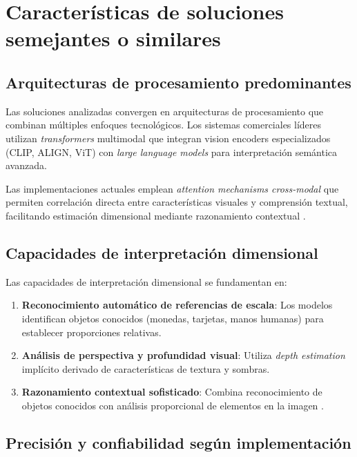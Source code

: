 \section{Características de soluciones semejantes o similares}

\subsection{Arquitecturas de procesamiento predominantes}

Las soluciones analizadas convergen en arquitecturas de procesamiento que combinan múltiples enfoques tecnológicos. Los sistemas comerciales líderes utilizan \textit{transformers} multimodal que integran vision encoders especializados (CLIP, ALIGN, ViT) con \textit{large language models} para interpretación semántica avanzada.

Las implementaciones actuales emplean \textit{attention mechanisms cross-modal} que permiten correlación directa entre características visuales y comprensión textual, facilitando estimación dimensional mediante razonamiento contextual \cite{Dosovitskiy2020}.

\subsection{Capacidades de interpretación dimensional}

Las capacidades de interpretación dimensional se fundamentan en:

\begin{enumerate}
    \item \textbf{Reconocimiento automático de referencias de escala}: Los modelos identifican objetos conocidos (monedas, tarjetas, manos humanas) para establecer proporciones relativas.
    \item \textbf{Análisis de perspectiva y profundidad visual}: Utiliza \textit{depth estimation} implícito derivado de características de textura y sombras.
    \item \textbf{Razonamiento contextual sofisticado}: Combina reconocimiento de objetos conocidos con análisis proporcional de elementos en la imagen \cite{Oquab2024}.
\end{enumerate}

\subsection{Precisión y confiabilidad según implementación}

